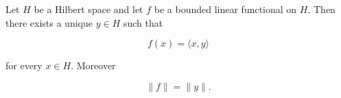 Let $H$ be a Hilbert space and let $f$ be a bounded linear functional on $H$. Then there exists a unique $y \in H$ such that

$$f(x) = \langle x, y \rangle$$

for every $x \in H$. Moreover

$$\|f\| = \|y\|.$$